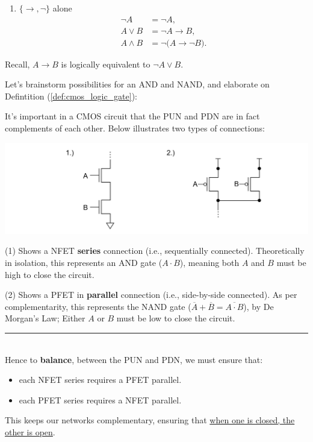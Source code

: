 \begin{Example}
\begin{enumerate}
  \item $\{\to,\neg\}$ alone
    \begin{align*}
      \neg A   &= \neg A,\\
      A\lor B  &= \neg A \to B,\\
      A\land B &= \neg\bigl(A \to \neg B\bigr).
    \end{align*}
\end{enumerate}

\noindent
Recall, $A \to B$ is logically equivalent to $\neg A \lor B$. 
\end{Example}

\newpage 

\noindent
Let's brainstorm possibilities for an AND and NAND, and elaborate on Defintition (\ref{def:cmos_logic_gate}):
\begin{theo}

  \label{theo:balancing_series_parallel}

    \noindent
    It's important in a CMOS circuit that the PUN and PDN are in fact complements of each other. Below
    illustrates two types of connections:

    \begin{center}
      \includegraphics[width=\textwidth]{Sections/circuits/np_comp.png}
    \end{center}

    \noindent
    (1) Shows a NFET \textbf{series} connection (i.e., sequentially connected). Theoretically in isolation, this represents
    an AND gate ($A \cdot B$), meaning both $A$ and $B$ must be high to close the circuit. 
    
    (2) Shows a PFET in \textbf{parallel} connection (i.e., side-by-side connected). As per complementarity, this represents the NAND gate
    ($\overline{A} + \overline{B} = \overline{A \cdot B}$), by De Morgan's Law; Either $A$ or $B$ must be low to close the circuit.\\
    \rule{\textwidth}{0.4pt}\\
    \noindent
    Hence to \textbf{balance}, between the PUN and PDN, we must ensure that:
    \begin{itemize}
        \item each NFET series requires a PFET parallel.
        \item each PFET series requires a NFET parallel.
    \end{itemize}

    \noindent
    This keeps our networks complementary, ensuring that \underline{when one is closed, the other is open}.
\end{theo}

